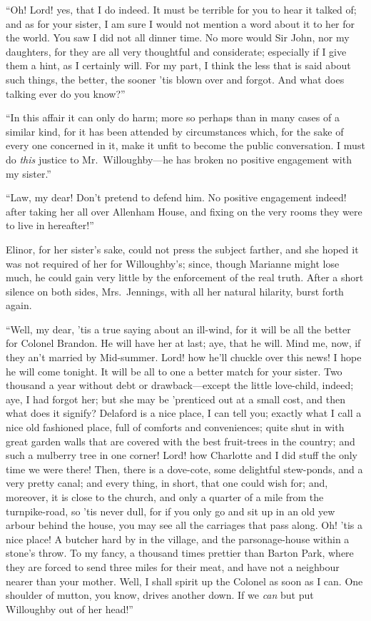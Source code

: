 ``Oh! Lord! yes, that I do indeed.  It must be terrible
for you to hear it talked of; and as for your sister,
I am sure I would not mention a word about it to her
for the world.  You saw I did not all dinner time.
No more would Sir John, nor my daughters, for they are
all very thoughtful and considerate; especially if I
give them a hint, as I certainly will.  For my part,
I think the less that is said about such things, the better,
the sooner 'tis blown over and forgot.  And what does
talking ever do you know?''

``In this affair it can only do harm; more so
perhaps than in many cases of a similar kind, for it
has been attended by circumstances which, for the sake
of every one concerned in it, make it unfit to become
the public conversation.  I must do \emph{this} justice to
Mr.\ Willoughby---he has broken no positive engagement
with my sister.''

``Law, my dear!  Don't pretend to defend him.
No positive engagement indeed! after taking her all
over Allenham House, and fixing on the very rooms they
were to live in hereafter!''

Elinor, for her sister's sake, could not press the
subject farther, and she hoped it was not required of her
for Willoughby's; since, though Marianne might lose much,
he could gain very little by the enforcement of the real truth.
After a short silence on both sides, Mrs.\ Jennings,
with all her natural hilarity, burst forth again.

``Well, my dear, 'tis a true saying about an ill-wind,
for it will be all the better for Colonel Brandon.
He will have her at last; aye, that he will.  Mind me,
now, if they an't married by Mid-summer.  Lord! how he'll
chuckle over this news!  I hope he will come tonight.
It will be all to one a better match for your sister.
Two thousand a year without debt or drawback---except
the little love-child, indeed; aye, I had forgot her;
but she may be 'prenticed out at a small cost, and then
what does it signify?  Delaford is a nice place, I can
tell you; exactly what I call a nice old fashioned place,
full of comforts and conveniences; quite shut in with great
garden walls that are covered with the best fruit-trees
in the country; and such a mulberry tree in one corner!
Lord! how Charlotte and I did stuff the only time we
were there!  Then, there is a dove-cote, some delightful
stew-ponds, and a very pretty canal; and every thing,
in short, that one could wish for; and, moreover, it is
close to the church, and only a quarter of a mile from
the turnpike-road, so 'tis never dull, for if you only
go and sit up in an old yew arbour behind the house,
you may see all the carriages that pass along.
Oh! 'tis a nice place!  A butcher hard by in the village,
and the parsonage-house within a stone's throw.
To my fancy, a thousand times prettier than Barton Park,
where they are forced to send three miles for their meat,
and have not a neighbour nearer than your mother.
Well, I shall spirit up the Colonel as soon as I can.
One shoulder of mutton, you know, drives another down.
If we \emph{can} but put Willoughby out of her head!''


